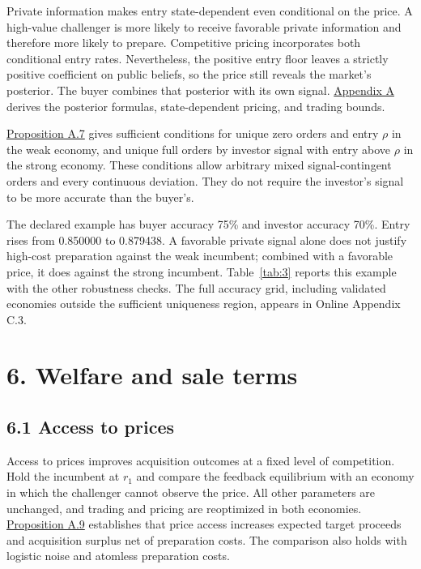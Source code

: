 \documentclass[
  12pt,
]{article}
\begin{document}
Private information makes entry state-dependent even conditional on the
price. A high-value challenger is more likely to receive favorable
private information and therefore more likely to prepare. Competitive
pricing incorporates both conditional entry rates. Nevertheless, the
positive entry floor leaves a strictly positive coefficient on public
beliefs, so the price still reveals the market's posterior. The buyer
combines that posterior with its own signal.
\hyperref[paper-appendix]{Appendix A} derives the posterior formulas,
state-dependent pricing, and trading bounds.

\hyperref[result-proposition-a-7]{Proposition A.7} gives sufficient
conditions for unique zero orders and entry \(\rho\) in the weak
economy, and unique full orders by investor signal with entry above
\(\rho\) in the strong economy. These conditions allow arbitrary mixed
signal-contingent orders and every continuous deviation. They do not
require the investor's signal to be more accurate than the buyer's.

The declared example has buyer accuracy 75\% and investor accuracy 70\%.
Entry rises from 0.850000 to 0.879438. A favorable private signal alone
does not justify high-cost preparation against the weak incumbent;
combined with a favorable price, it does against the strong incumbent.
Table~\ref{tab:3} reports this example with the other robustness checks.
The full accuracy grid, including validated economies outside the
sufficient uniqueness region, appears in Online Appendix C.3.

\setcounter{table}{2}
\begin{table}[tbp]\begingroup\singlespacing\small\centering
\caption{Robustness and complementary private information.}\label{tab:3}

\par\endgroup\end{table}

\section{6. Welfare and sale terms}\label{sec-welfare}

\subsection{6.1 Access to prices}\label{sec-access-to-prices}

Access to prices improves acquisition outcomes at a fixed level of
competition. Hold the incumbent at \(r_1\) and compare the feedback
equilibrium with an economy in which the challenger cannot observe the
price. All other parameters are unchanged, and trading and pricing are
reoptimized in both economies.
\hyperref[result-proposition-a-9]{Proposition A.9} establishes that
price access increases expected target proceeds and acquisition surplus
net of preparation costs. The comparison also holds with logistic noise
and atomless preparation costs.
\end{document}
